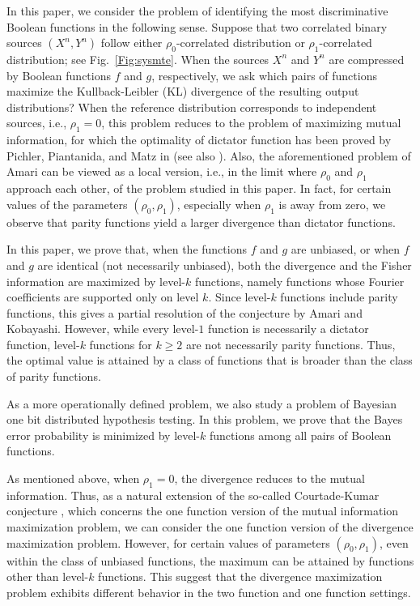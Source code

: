 \documentclass[journal,draftcls, onecolumn]{IEEEtran}
\begin{document}
In this paper, we consider the problem of identifying the most discriminative Boolean functions in the following sense.
Suppose that two correlated binary sources $(X^n,Y^n)$ follow either $\rho_0$-correlated distribution or $\rho_1$-correlated distribution; see Fig.~\ref{Fig:sysmte}.
When the sources $X^n$ and $Y^n$ are compressed by Boolean functions $f$ and $g$, respectively, 
we ask which pairs of functions maximize the Kullback-Leibler (KL) divergence of the resulting output distributions?
When the reference distribution corresponds to independent sources, i.e., $\rho_1=0$, this problem reduces to the 
problem of maximizing mutual information, for which the optimality of dictator function has been proved by
Pichler, Piantanida, and Matz in \cite{PicPiaMat:18} (see also \cite{Pichler:thesis}). Also, the aforementioned problem of Amari can be viewed 
as a local version, i.e., in the limit where $\rho_0$ and $\rho_1$ approach each other, of the problem studied in this paper. 
In fact, for certain values of the parameters $(\rho_0,\rho_1)$, especially when $\rho_1$ is away from zero, 
we observe that parity functions yield a larger divergence than dictator functions.

In this paper, we prove that, when the functions $f$ and $g$ are unbiased, or when $f$ and $g$ are identical (not necessarily unbiased),
both the divergence and the Fisher information are maximized by level-$k$ functions, namely functions 
whose Fourier coefficients are supported only on level $k$. Since level-$k$ functions include parity functions,
this gives a partial resolution of the conjecture by Amari and Kobayashi. However, while every level-$1$ function is
necessarily a dictator function, level-$k$ functions for $k\ge 2$ are not necessarily parity functions.
Thus, the optimal value is attained by a class of functions that is broader than the class of parity functions.

As a more operationally defined problem,
we also study a problem of Bayesian one bit distributed hypothesis testing. 
In this problem, we prove that the Bayes error probability is minimized by level-$k$ functions
among all pairs of Boolean functions. 

As mentioned above, when $\rho_1=0$, the divergence reduces to the mutual information.
Thus, as a natural extension of the so-called Courtade-Kumar conjecture \cite{CouKum:14}, which concerns the one function
version of the mutual information maximization problem, we can consider the one function version of the divergence maximization problem.
However, for certain values of parameters $(\rho_0,\rho_1)$, even within the class of unbiased functions, the maximum can
be attained by functions other than level-$k$ functions. This suggest that the divergence maximization problem
exhibits different behavior in the two function and one function settings. 
\end{document}

